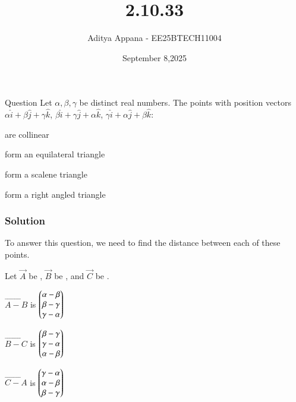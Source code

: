 \documentclass{beamer}
\title %
{2.10.33}
\date{September 8,2025}
\author %
{Aditya Appana - EE25BTECH11004}
\begin{document}
\frame{\titlepage}
\begin{frame}{Question}
Let $\alpha , \beta, \gamma$ be distinct real numbers. The points with position vectors $\alpha\hat{i} + \beta\hat{j} + \gamma\hat{k}$, $\beta\hat{i} +\gamma\hat{j} + \alpha\hat{k}$, $\gamma\hat{i} + \alpha\hat{j} + \beta\hat{k}$:

\begin{enumerate}\begin{multicols}{2}
    \item are collinear
    \item form an equilateral triangle
    \item form a scalene triangle
    \item form a right angled triangle
    \end{multicols}
\end{enumerate}
\end{frame}



\begin{frame}[fragile]
    \frametitle{Solution}

To answer this question, we need to find the distance between each of these points.

Let $\vec{A}$ be \myvec{\alpha \\ \beta \\ \gamma}, $\vec{B}$ be \myvec{ \beta \\ \gamma \\ \alpha}, and $\vec{C}$ be \myvec{\gamma \\ \alpha \\ \beta}. \\



\begin{itemize} \begin{multicols}{3}
    \item $\vec{A-B}$ is $\begin{pmatrix}\alpha - \beta \\ \beta - \gamma \\ \gamma - \alpha\end{pmatrix}$
    \item $\vec{B-C}$ is $\begin{pmatrix}\beta - \gamma \\ \gamma - \alpha \\ \alpha - \beta\end{pmatrix}$
    \item $\vec{C-A}$ is $\begin{pmatrix}\gamma - \alpha \\ \alpha - \beta \\ \beta - \gamma\end{pmatrix}$
    \end{multicols}
\end{itemize}

\end{frame}
\end{document}
